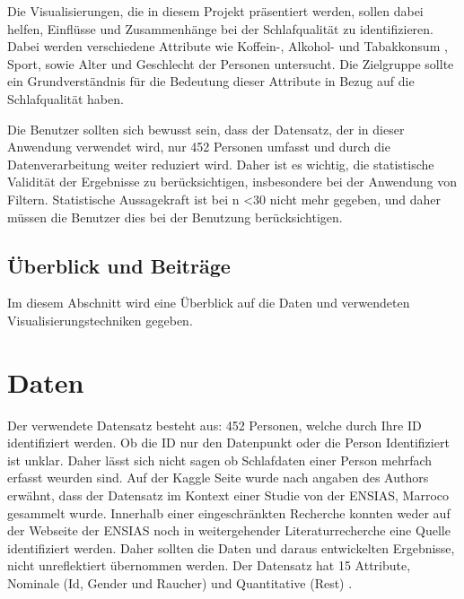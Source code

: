 \documentclass[usegeometry=true]{scrartcl}
\begin{document}
Die Visualisierungen, die in diesem Projekt präsentiert werden, sollen dabei helfen, Einflüsse und Zusammenhänge
 bei der Schlafqualität zu identifizieren. Dabei werden verschiedene Attribute wie Koffein-, Alkohol- und Tabakkonsum
 , Sport, sowie Alter und Geschlecht der Personen untersucht. Die Zielgruppe sollte ein Grundverständnis
  für die Bedeutung dieser Attribute in Bezug auf die Schlafqualität haben.

Die Benutzer sollten sich bewusst sein, dass der Datensatz, der in dieser Anwendung verwendet wird,
 nur 452 Personen umfasst und durch die Datenverarbeitung weiter reduziert wird. 
 Daher ist es wichtig, die statistische Validität der Ergebnisse zu berücksichtigen,
  insbesondere bei der Anwendung von Filtern. Statistische Aussagekraft ist bei n <30 nicht mehr gegeben,
   und daher müssen die Benutzer dies bei der Benutzung berücksichtigen.



\subsection{Überblick und Beiträge}
Im diesem Abschnitt wird eine Überblick auf die Daten und verwendeten Visualisierungstechniken gegeben. 

\section{Daten}

Der verwendete Datensatz besteht aus: 452 Personen, welche durch Ihre ID identifiziert werden. Ob die ID nur den Datenpunkt oder die Person Identifiziert ist unklar. Daher lässt sich nicht sagen ob Schlafdaten einer Person mehrfach erfasst weurden sind. 
Auf der Kaggle Seite wurde nach angaben des Authors erwähnt, dass der Datensatz im Kontext einer Studie von der ENSIAS, Marroco gesammelt wurde.
Innerhalb einer eingeschränkten Recherche konnten weder auf der Webseite der ENSIAS noch in weitergehender Literaturrecherche eine Quelle identifiziert werden. Daher sollten die Daten und daraus entwickelten Ergebnisse, nicht unreflektiert übernommen werden. 
Der Datensatz hat 15 Attribute, Nominale (Id, Gender und Raucher) und Quantitative (Rest) .\\
\end{document}
